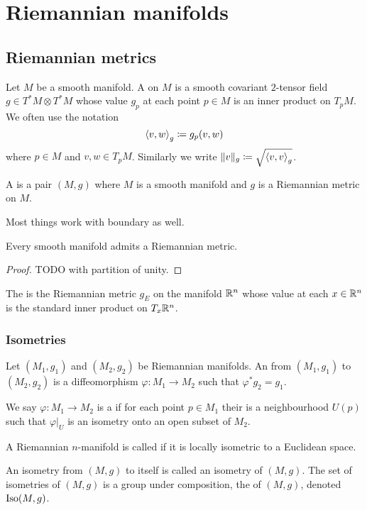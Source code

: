 \chapter{Riemannian manifolds}
\section{Riemannian metrics}
\begin{definition}
Let $M$ be a smooth manifold. A  on $M$ is a smooth covariant $2$-tensor field $g\in T^*M\otimes T^*M$ whose value $g_p$ at each point $p\in M$ is an inner product on $T_pM$. We often use the notation
\[ \left\langle v,w \right\rangle_g \coloneqq g_p(v,w) \]
where $p\in M$ and $v,w\in T_pM$. Similarly we write $\lVert v\rVert_g \coloneqq \sqrt{\left\langle v,v \right\rangle_g}$.

A  is a pair $(M,g)$ where $M$ is a smooth manifold and $g$ is a Riemannian metric on $M$.
\end{definition}

Most things work with boundary as well.

\begin{lemma}
Every smooth manifold admits a Riemannian metric.
\end{lemma}
\begin{proof}
TODO with partition of unity.
\end{proof}

\begin{example}
The  is the Riemannian metric $g_E$ on the manifold $\mathbb{R}^n$ whose value at each $x\in\mathbb{R}^n$ is the standard inner product on $T_x\mathbb{R}^n$.
\end{example}

\subsection{Isometries}
\begin{definition}
Let $(M_1, g_1)$ and $(M_2, g_2)$ be Riemannian manifolds. An  from $(M_1, g_1)$ to $(M_2, g_2)$ is a diffeomorphism $\varphi: M_1\to M_2$ such that $\varphi^* g_2 = g_1$.

We say $\varphi: M_1\to M_2$ is a  if for each point $p\in M_1$ their is a neighbourhood $U(p)$ such that $\varphi|_U$ is an isometry onto an open subset of $M_2$.

A Riemannian $n$-manifold is called  if it is locally isometric to a Euclidean space.
\end{definition}
An isometry from $(M,g)$ to itself is called an isometry of $(M,g)$. The set of isometries of $(M,g)$ is a group under composition, the  of $(M,g)$, denoted $\operatorname{Iso}(M,g)$.


